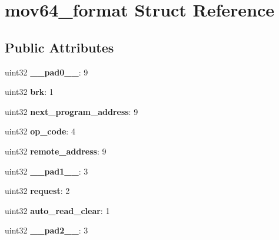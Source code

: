 \hypertarget{structmov64__format}{}\section{mov64\+\_\+format Struct Reference}
\label{structmov64__format}
\subsection*{Public Attributes}
\begin{DoxyCompactItemize}
\item 
\mbox{\label{structmov64__format_aa23f57d4277afc588012df9faf64ce1d}} 
uint32 {\bfseries \+\_\+\+\_\+pad0\+\_\+\+\_\+}\+: 9
\item 
\mbox{\label{structmov64__format_a41a0e6776978de1ac1d52742283a2264}} 
uint32 {\bfseries brk}\+: 1
\item 
\mbox{\label{structmov64__format_a77479764e6cb33a34dc453f626d5210f}} 
uint32 {\bfseries next\+\_\+program\+\_\+address}\+: 9
\item 
\mbox{\label{structmov64__format_a797790d93f351db7be113db307853745}} 
uint32 {\bfseries op\+\_\+code}\+: 4
\item 
\mbox{\label{structmov64__format_aa765cca1a02cef481f0c22377754c5da}} 
uint32 {\bfseries remote\+\_\+address}\+: 9
\item 
\mbox{\label{structmov64__format_af3ac116e27628013c6f342d536443813}} 
uint32 {\bfseries \+\_\+\+\_\+pad1\+\_\+\+\_\+}\+: 3
\item 
\mbox{\label{structmov64__format_a382c0f5935c30621c34f104d49ece16a}} 
uint32 {\bfseries request}\+: 2
\item 
\mbox{\label{structmov64__format_aa3ecc537f4681ba04dc2229ae60783ea}} 
uint32 {\bfseries auto\+\_\+read\+\_\+clear}\+: 1
\item 
\mbox{\label{structmov64__format_a7a3c0469d469e30edda80ce91aec98c4}} 
uint32 {\bfseries \+\_\+\+\_\+pad2\+\_\+\+\_\+}\+: 3

\end{DoxyCompactItemize}
